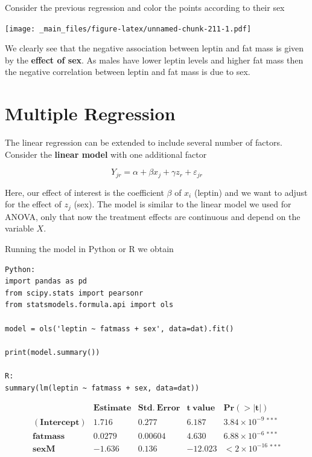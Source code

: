 \documentclass[
]{book}
\begin{document}
Consider the previous regression and color the points according to their sex

\texttt{[image: \_main\_files/figure-latex/unnamed-chunk-211-1.pdf]}

We clearly see that the negative association between leptin and fat mass is given by the \textbf{effect of sex}. As males have lower leptin levels and higher fat mass then the negative correlation between leptin and fat mass is due to sex.

\hypertarget{multiple-regression}{%
\section{Multiple Regression}\label{multiple-regression}}

The linear regression can be extended to include several number of factors. Consider the \textbf{linear model} with one additional factor

\[Y_{jr} = \alpha + \beta x_j +\gamma z_{r}+\varepsilon_{jr}\]

Here, our effect of interest is the coefficient \(\beta\) of \(x_i\) (leptin) and we want to adjust for the effect of \(z_j\) (sex). The model is similar to the linear model we used for ANOVA, only that now the treatment effects are continuous and depend on the variable \(X\).

Running the model in Python or R we obtain

\begin{verbatim}
Python:
import pandas as pd
from scipy.stats import pearsonr
from statsmodels.formula.api import ols

model = ols('leptin ~ fatmass + sex', data=dat).fit()

print(model.summary())

R:
summary(lm(leptin ~ fatmass + sex, data=dat))
\end{verbatim}

\[
\begin{array}{lcccc}
 & \mathbf{Estimate} & \mathbf{Std.\ Error} & \mathbf{t\ value} & \mathbf{Pr(>|t|)} \\ 
\mathbf{(Intercept)} & 1.716 & 0.277 & 6.187 & 3.84 \times 10^{-9} \ ^{***} \\
\mathbf{fatmass}     & 0.0279 & 0.00604 & 4.630 & 6.88 \times 10^{-6} \ ^{***} \\
\mathbf{sexM}        & -1.636 & 0.136 & -12.023 & <2 \times 10^{-16} \ ^{***} \\
\end{array}
\]
\end{document}
